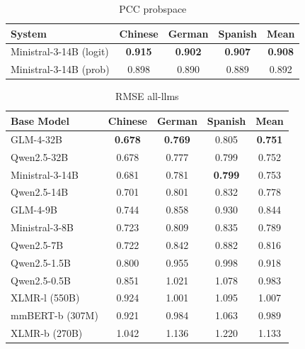 \begin{table}[t]
\setlength{\tabcolsep}{3.1pt}
\footnotesize
\centering
\begin{tabular}{lcccc}
\toprule
System & Chinese & German & Spanish & Mean \\
\midrule
Ministral-3-14B (logit) & \textbf{0.915} & \textbf{0.902} & \textbf{0.907} & \textbf{0.908} \\
Ministral-3-14B (prob) & 0.898 & 0.890 & 0.889 & 0.892 \\
\bottomrule
\end{tabular}
\caption{PCC probspace}
\label{tab:pcc-probspace}
\end{table}

\begin{table}[t]
\setlength{\tabcolsep}{3.1pt}
\footnotesize
\centering
\begin{tabularx}{\linewidth}{Xcccc}
\toprule
Base Model & Chinese & German & Spanish & Mean \\
\midrule
GLM-4-32B & \textbf{0.678} & \textbf{0.769} & 0.805 & \textbf{0.751} \\
Qwen2.5-32B & 0.678 & 0.777 & 0.799 & 0.752 \\
\midrule
Ministral-3-14B & 0.681 & 0.781 & \textbf{0.799} & 0.753 \\
Qwen2.5-14B & 0.701 & 0.801 & 0.832 & 0.778 \\
\midrule
GLM-4-9B & 0.744 & 0.858 & 0.930 & 0.844 \\
Ministral-3-8B & 0.723 & 0.809 & 0.835 & 0.789 \\
Qwen2.5-7B & 0.722 & 0.842 & 0.882 & 0.816 \\
\midrule
Qwen2.5-1.5B & 0.800 & 0.955 & 0.998 & 0.918 \\
\midrule
Qwen2.5-0.5B & 0.851 & 1.021 & 1.078 & 0.983 \\
XLMR-l (550B) & 0.924 & 1.001 & 1.095 & 1.007 \\
\midrule
mmBERT-b (307M) & 0.921 & 0.984 & 1.063 & 0.989 \\
XLMR-b (270B) & 1.042 & 1.136 & 1.220 & 1.133 \\
\bottomrule
\end{tabularx}
\caption{RMSE all-llms}
\label{tab:rmse-all-llms}
\end{table}

